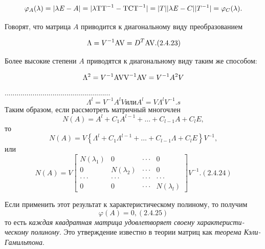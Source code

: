 		
\begin{equation}\label{key}
		\varphi _A(\lambda )=|\mathit{\lambda E}-A|=|\lambda \normalsubformula{\text{TT}}^{-1}-\normalsubformula{\text{TCT}}^{-1}|=|T||\mathit{\lambda E}-C||T^{-1}|=\varphi _C(\lambda ).
\end{equation}



		Говорят, что матрица  $A$ приводится к диагональному виду преобразованием



\begin{equation}\label{key}
	\Lambda =V^{-1}\normalsubformula{\text{AV}}=D^T\normalsubformula{\text{AV}}.(2.4.23)
\end{equation}



		Более высокие степени  $A$ приводятся к диагональному виду таким же способом:


\begin{equation*}
\Lambda ^2=V^{-1}\normalsubformula{\text{AVV}}^{-1}\normalsubformula{\text{AV}}=V^{-1}A^2V
\end{equation*}
		  .....................................................
\begin{equation*}\label{key}
	\Lambda ^l=V^{-1}A^lV или  A^l=\mathit{V\Lambda }^lV^{-1}.s
\end{equation*}
		Таким образом, если рассмотреть матричный многочлен 
\begin{equation*}
N(A)=A^l+C_1A^{l-1}+\ldots +C_{l-1}A+C_lE,
\end{equation*}
		то 
\begin{equation*}
N(A)=V\left\{\Lambda ^l+C_1\Lambda ^{l-1}+\ldots +C_{l-1}\Lambda +C_lE\right\}V^{-1},
\end{equation*}
		или
\begin{equation}\label{key}
		  N(A)=V\left[
		\begin{matrix}
		N(\lambda _1)&0&\cdot \cdot \cdot &0\\0&N(\lambda _2)&\cdot \cdot \cdot &0\\\cdot \cdot \cdot &\cdot
		\cdot \cdot &\cdot \cdot \cdot &\cdot \cdot \cdot \\0&0&\cdot \cdot \cdot
		&N(\lambda _l)
		\end{matrix}
		\right]V^{-1}.
		(2.4.24)
\end{equation}


		Если применить этот результат к характеристическому полиному, то получим
\begin{equation}\label{key}
 		\varphi (A)=0,  
 		(2.4.25) 
\end{equation}
		то есть \textit{каждая квадратная матрица удовлетворяет своему харак­те­ри­сти­ческому полиному}. Это утверждение
		известно в теории матриц как \textit{теорема Кэли-Гамильтона}.



